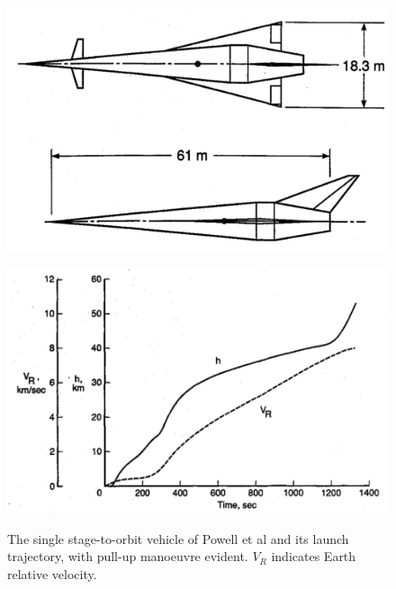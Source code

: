 \begin{figure}[h]
	\centering
	\begin{minipage}[b]{0.3\textwidth}
		\centering
		\includegraphics[width=\linewidth]{"figures/2_literature-review/Powell Vehicle"}
		
		\label{fig:PowellVehicle}
	\end{minipage}	
	\begin{minipage}[b]{0.6\textwidth}
		\includegraphics[width=\linewidth]{"figures/2_literature-review/Powell Trajectory"}
		
		\label{fig:PowellTrajectory}
	\end{minipage}
	\caption{The single stage-to-orbit vehicle of Powell et al\cite{Powell1991} and its launch trajectory, with pull-up manoeuvre evident. $V_R$ indicates Earth relative velocity. }
	\label{fig:Powell}
\end{figure}
